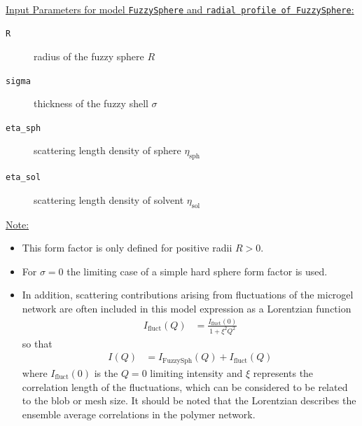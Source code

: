 \vspace{5mm}

\hspace{1pt}\\
\underline{Input Parameters for model \texttt{FuzzySphere} and \texttt{radial profile of FuzzySphere}:}\\
\begin{description}
\item[\texttt{R}] radius of the fuzzy sphere  $R$
\item[\texttt{sigma}] thickness of the fuzzy shell $\sigma$
\item[\texttt{eta\_sph}] scattering length density of sphere
$\eta_\text{sph}$ \item[\texttt{eta\_sol}] scattering length
density of solvent $\eta_\text{sol}$
\end{description}

\noindent\underline{Note:}
\begin{itemize}
\item This form factor is only defined for positive radii $R>0$.
\item For $\sigma = 0$ the limiting case of a simple hard sphere
form factor is used.
\item In addition, scattering contributions
arising from fluctuations of the microgel network are often
included in this model expression as a Lorentzian function
\begin{align}
I_\text{fluct}(Q) &= \frac{I_\text{fluct}(0)}{1+\xi^2Q^2}
\end{align}
so that
\begin{align}
I(Q) &= I_\text{FuzzySph}(Q)+I_\text{fluct}(Q)
\end{align}
where $I_\text{fluct}(0)$ is the $Q=0$ limiting intensity and
$\xi$ represents the correlation length of the fluctuations, which
can be considered to be related to the blob or mesh size. It
should be noted that the Lorentzian describes the ensemble average
correlations in the polymer network.

\end{itemize}

